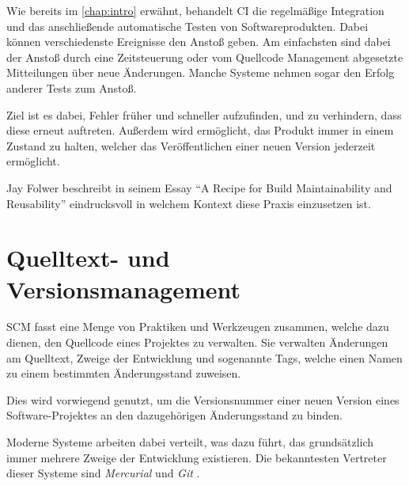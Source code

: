 Wie bereits im \cref{chap:intro} erwähnt, behandelt \ac{CI} die regelmäßige Integration und das anschließende automatische Testen von Softwareprodukten.
Dabei können verschiedenste Ereignisse den Anstoß geben.
Am einfachsten sind dabei der Anstoß durch eine Zeitsteuerung
oder vom Quellcode Management abgesetzte Mitteilungen über neue Änderungen.
Manche Systeme nehmen sogar den Erfolg anderer Tests zum Anstoß.

Ziel ist es dabei, Fehler früher und schneller aufzufinden,
und zu verhindern, dass diese erneut auftreten.
Außerdem wird ermöglicht, das Produkt immer in einem Zustand zu halten,
welcher das Veröffentlichen einer neuen Version jederzeit ermöglicht.

Jay Folwer beschreibt in seinem Essay ``A Recipe for Build Maintainability and Reusability'' \cite{folwer:receipe} eindrucksvoll in welchem Kontext diese Praxis einzusetzen ist.


\section{Quelltext- und Versionsmanagement}
\label{sec:base:scm}


\ac{SCM} fasst eine Menge von Praktiken und Werkzeugen zusammen,
welche dazu dienen, den Quellcode eines Projektes zu verwalten.
Sie verwalten Änderungen am Quelltext, Zweige der Entwicklung und sogenannte Tags,
welche einen Namen zu einem bestimmten Änderungsstand zuweisen.

Dies wird vorwiegend genutzt, um die Versionsnummer einer neuen Version eines Software-Projektes an den dazugehörigen Änderungsstand zu binden.

Moderne Systeme arbeiten dabei verteilt,
was dazu führt, das grundsätzlich immer mehrere Zweige der Entwicklung existieren.
Die bekanntesten Vertreter dieser Systeme sind \emph{Mercurial} \cite{mercurial:website}
und \emph{Git} \cite{git:website}.

